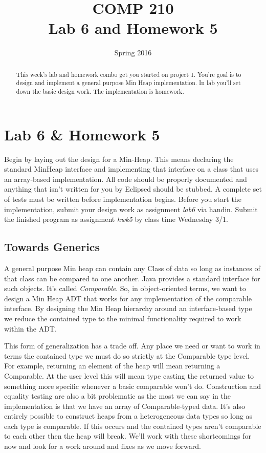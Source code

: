 \documentclass[nobib]{tufte-handout}
\title{COMP 210 \\ Lab 6 and Homework 5}
\date{Spring 2016}
\begin{document}
\maketitle

\begin{abstract}
This week's lab and homework combo get you started on project 1. You're goal is to design and implement a general purpose Min Heap implementation.  In lab you'll set down the basic design work. The implementation is homework.
\end{abstract}

\section{Lab 6 \& Homework 5}

Begin by laying out the design for a Min-Heap. This means declaring the standard MinHeap interface and implementing that interface on a class that uses an array-based implementation. All code should be properly documented and anything that isn't written for you by Eclipsed should be stubbed. A complete set of tests must be written before implementation begins. Before you start the implementation, submit your design work as assignment \textit{lab6} via handin. Submit the finished program as assignment \textit{hwk5} by class time Wednesday 3/1.

\subsection{ Towards Generics }

A general purpose Min heap can contain any Class of data so long as instances of that class can be compared to one another. Java provides a standard interface for such objects. It's called \textit{Comparable}.  So, in object-oriented terms, we want to design a Min Heap ADT that works for any implementation of the comparable interface. By designing the Min Heap hierarchy around an interface-based type we reduce the contained type to the minimal functionality required to work within the ADT\@.

This form of generalization has a trade off. Any place we need or want to work in terms the contained type we must do so strictly at the Comparable type level. For example, returning an element of the heap will mean returning a Comparable. At the user level this will mean type casting the returned value to something more specific whenever a basic comparable won't do. Construction and equality testing are also a bit problematic as the most we can say in the implementation is that we have an array of Comparable-typed data. It's also entirely possible to construct heaps from a heterogeneous data types so long as each type is comparable. If this occurs and the contained types aren't comparable to each other then the heap will break.  We'll work with these shortcomings for now and look for a work around and fixes as we move forward. 
\end{document}
